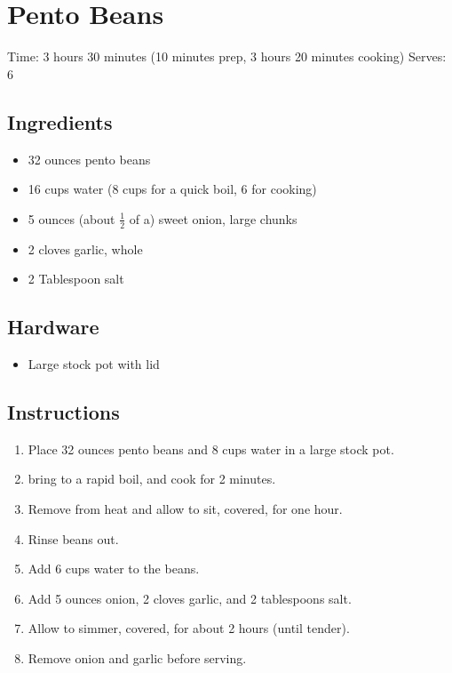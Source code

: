 \section{Pento Beans}
\label{pentoBeans}
\setcounter{secnumdepth}{0}
Time: 3 hours 30 minutes (10 minutes prep, 3 hours 20 minutes cooking)
Serves: 6

\begin{multicols}{2}
\subsection*{Ingredients}
\begin{itemize}
    \item 32 ounces pento beans
    \item 16 cups water (8 cups for a quick boil, 6 for cooking)
    \item 5 ounces (about \( \frac{1}{2} \) of a) sweet onion, large chunks
    \item 2 cloves garlic, whole
    \item 2 Tablespoon salt
\end{itemize}

\subsection*{Hardware}
\begin{itemize}
    \item Large stock pot with lid
\end{itemize}
\clearpage

\subsection*{Instructions}
\begin{enumerate}
    \item Place 32 ounces pento beans and 8 cups water in a large stock pot.
    \item bring to a rapid boil, and cook for 2 minutes.
    \item Remove from heat and allow to sit, covered, for one hour.
    \item Rinse beans out.
    \item Add 6 cups water to the beans.
    \item Add 5 ounces onion, 2 cloves garlic, and 2 tablespoons salt.
    \item Allow to simmer, covered, for about 2 hours (until tender).
    \item Remove onion and garlic before serving.
\end{enumerate}


\end{multicols}
